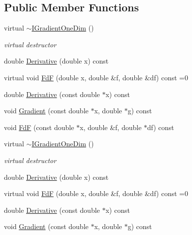 \subsection*{Public Member Functions}
\begin{DoxyCompactItemize}
\item 
virtual \mbox{\hyperlink{classROOT_1_1Math_1_1IGradientOneDim_ab3a9fce54752c72f4ee4ed520f5cb80f}{$\sim$\+I\+Gradient\+One\+Dim}} ()
\begin{DoxyCompactList}\small\item\em virtual destructor \end{DoxyCompactList}\item 
double \mbox{\hyperlink{classROOT_1_1Math_1_1IGradientOneDim_a1fd109c1ddc7bae1c647f096e1fd527f}{Derivative}} (double x) const
\item 
virtual void \mbox{\hyperlink{classROOT_1_1Math_1_1IGradientOneDim_aef5560ea7d43e64d94bf875713e2a5fc}{FdF}} (double x, double \&f, double \&df) const =0
\item 
double \mbox{\hyperlink{classROOT_1_1Math_1_1IGradientOneDim_ab28c444cba126cc1b380d21120dd437f}{Derivative}} (const double $\ast$x) const
\item 
void \mbox{\hyperlink{classROOT_1_1Math_1_1IGradientOneDim_ac00c2cdc7a93ea4358f2f1df8e3499eb}{Gradient}} (const double $\ast$x, double $\ast$g) const
\item 
void \mbox{\hyperlink{classROOT_1_1Math_1_1IGradientOneDim_a4d51d8a5bfdb547348b6da33008f6a9e}{FdF}} (const double $\ast$x, double \&f, double $\ast$df) const
\item 
virtual \mbox{\hyperlink{classROOT_1_1Math_1_1IGradientOneDim_ab3a9fce54752c72f4ee4ed520f5cb80f}{$\sim$\+I\+Gradient\+One\+Dim}} ()
\begin{DoxyCompactList}\small\item\em virtual destructor \end{DoxyCompactList}\item 
double \mbox{\hyperlink{classROOT_1_1Math_1_1IGradientOneDim_a1fd109c1ddc7bae1c647f096e1fd527f}{Derivative}} (double x) const
\item 
virtual void \mbox{\hyperlink{classROOT_1_1Math_1_1IGradientOneDim_aef5560ea7d43e64d94bf875713e2a5fc}{FdF}} (double x, double \&f, double \&df) const =0
\item 
double \mbox{\hyperlink{classROOT_1_1Math_1_1IGradientOneDim_ab28c444cba126cc1b380d21120dd437f}{Derivative}} (const double $\ast$x) const
\item 
void \mbox{\hyperlink{classROOT_1_1Math_1_1IGradientOneDim_ac00c2cdc7a93ea4358f2f1df8e3499eb}{Gradient}} (const double $\ast$x, double $\ast$g) const

\end{DoxyCompactItemize}
